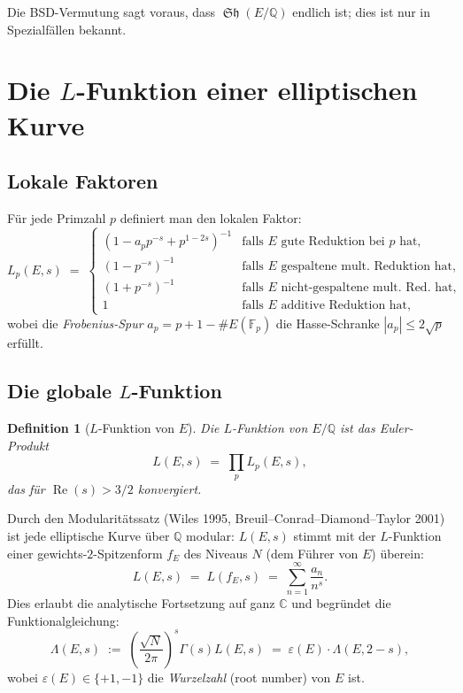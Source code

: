 \documentclass[12pt,a4paper]{article}
\newtheorem{definition}[theorem]{Definition}
\theoremstyle{remark}
\DeclareMathOperator{\Sha}{\mathfrak{Sh}}
\begin{document}
Die BSD-Vermutung sagt voraus, dass $\Sha(E/\mathbb{Q})$ endlich ist; dies ist nur in
Spezialfällen bekannt.

\section{Die $L$-Funktion einer elliptischen Kurve}

\subsection{Lokale Faktoren}

Für jede Primzahl $p$ definiert man den lokalen Faktor:
\[
  L_p(E, s) \;=\;
  \begin{cases}
    (1 - a_p p^{-s} + p^{1-2s})^{-1} & \text{falls } E \text{ gute Reduktion bei } p \text{ hat,} \\
    (1 - p^{-s})^{-1}                 & \text{falls } E \text{ gespaltene mult.\ Reduktion hat,} \\
    (1 + p^{-s})^{-1}                 & \text{falls } E \text{ nicht-gespaltene mult.\ Red.\ hat,} \\
    1                                  & \text{falls } E \text{ additive Reduktion hat,}
  \end{cases}
\]
wobei die \emph{Frobenius-Spur} $a_p = p + 1 - \#E(\mathbb{F}_p)$ die Hasse-Schranke
$|a_p| \leq 2\sqrt{p}$ erfüllt.

\subsection{Die globale $L$-Funktion}

\begin{definition}[$L$-Funktion von $E$]
  Die \emph{$L$-Funktion} von $E/\mathbb{Q}$ ist das Euler-Produkt
  \begin{equation}\label{eq:lfunction}
    L(E,s) \;=\; \prod_p L_p(E,s),
  \end{equation}
  das für $\operatorname{Re}(s) > 3/2$ konvergiert.
\end{definition}

Durch den Modularitätssatz (Wiles 1995, Breuil--Conrad--Diamond--Taylor 2001) ist jede
elliptische Kurve über $\mathbb{Q}$ modular: $L(E,s)$ stimmt mit der $L$-Funktion einer
gewichts-$2$-Spitzenform $f_E$ des Niveaus $N$ (dem Führer von $E$) überein:
\[
  L(E,s) \;=\; L(f_E,s) \;=\; \sum_{n=1}^\infty \frac{a_n}{n^s}.
\]
Dies erlaubt die analytische Fortsetzung auf ganz $\mathbb{C}$ und begründet die
Funktionalgleichung:
\begin{equation}\label{eq:functional}
  \Lambda(E,s) \;:=\; \left(\frac{\sqrt{N}}{2\pi}\right)^s \Gamma(s) L(E,s)
  \;=\; \varepsilon(E) \cdot \Lambda(E, 2-s),
\end{equation}
wobei $\varepsilon(E) \in \{+1,-1\}$ die \emph{Wurzelzahl} (root number) von $E$ ist.
\end{document}
